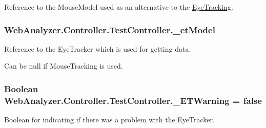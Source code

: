 Reference to the Mouse\+Model used as an alternative to the \hyperlink{namespace_web_analyzer_1_1_eye_tracking}{Eye\+Tracking}. 

\hypertarget{class_web_analyzer_1_1_controller_1_1_test_controller_a0db36e46096d444386af0d357905f430}{}
\subsubsection[{\+\_\+et\+Model}]{ Web\+Analyzer.\+Controller.\+Test\+Controller.\+\_\+et\+Model\hspace{0.3cm}{\ttfamily [private]}}\label{class_web_analyzer_1_1_controller_1_1_test_controller_a0db36e46096d444386af0d357905f430}


Reference to the Eye\+Tracker which is used for getting data. 

Can be null if Mouse\+Tracking is used.\hypertarget{class_web_analyzer_1_1_controller_1_1_test_controller_a33b43014ccf6b9f7cdd1e3136ac19d3a}{}
\subsubsection[{\+\_\+\+E\+T\+Warning}]{\setlength{\rightskip}{0pt plus 5cm}Boolean Web\+Analyzer.\+Controller.\+Test\+Controller.\+\_\+\+E\+T\+Warning = {\bf false}\hspace{0.3cm}{\ttfamily [private]}}\label{class_web_analyzer_1_1_controller_1_1_test_controller_a33b43014ccf6b9f7cdd1e3136ac19d3a}


Boolean for indicating if there was a problem with the Eye\+Tracker. 

\hypertarget{class_web_analyzer_1_1_controller_1_1_test_controller_ac2155d50816dddd7e62689655d3a978f}{}
